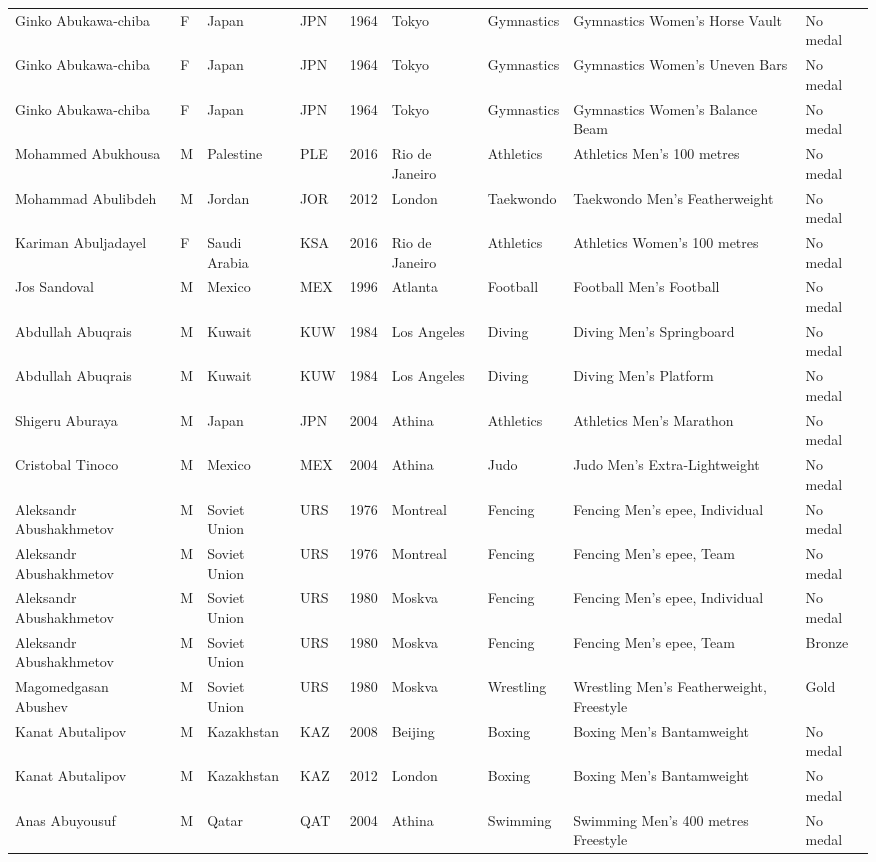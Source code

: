 \documentclass{article}%
\begin{document}
\begin{longtable}{l l l l l l l l l}
Ginko Abukawa{-}chiba&F&Japan&JPN&1964&Tokyo&Gymnastics&Gymnastics Women's Horse Vault&No medal\\%
Ginko Abukawa{-}chiba&F&Japan&JPN&1964&Tokyo&Gymnastics&Gymnastics Women's Uneven Bars&No medal\\%
Ginko Abukawa{-}chiba&F&Japan&JPN&1964&Tokyo&Gymnastics&Gymnastics Women's Balance Beam&No medal\\%
Mohammed Abukhousa&M&Palestine&PLE&2016&Rio de Janeiro&Athletics&Athletics Men's 100 metres&No medal\\%
Mohammad Abulibdeh&M&Jordan&JOR&2012&London&Taekwondo&Taekwondo Men's Featherweight&No medal\\%
Kariman Abuljadayel&F&Saudi Arabia&KSA&2016&Rio de Janeiro&Athletics&Athletics Women's 100 metres&No medal\\%
Jos Sandoval&M&Mexico&MEX&1996&Atlanta&Football&Football Men's Football&No medal\\%
Abdullah Abuqrais&M&Kuwait&KUW&1984&Los Angeles&Diving&Diving Men's Springboard&No medal\\%
Abdullah Abuqrais&M&Kuwait&KUW&1984&Los Angeles&Diving&Diving Men's Platform&No medal\\%
Shigeru Aburaya&M&Japan&JPN&2004&Athina&Athletics&Athletics Men's Marathon&No medal\\%
Cristobal Tinoco&M&Mexico&MEX&2004&Athina&Judo&Judo Men's Extra{-}Lightweight&No medal\\%
Aleksandr Abushakhmetov&M&Soviet Union&URS&1976&Montreal&Fencing&Fencing Men's epee, Individual&No medal\\%
Aleksandr Abushakhmetov&M&Soviet Union&URS&1976&Montreal&Fencing&Fencing Men's epee, Team&No medal\\%
Aleksandr Abushakhmetov&M&Soviet Union&URS&1980&Moskva&Fencing&Fencing Men's epee, Individual&No medal\\%
Aleksandr Abushakhmetov&M&Soviet Union&URS&1980&Moskva&Fencing&Fencing Men's epee, Team&Bronze\\%
Magomedgasan Abushev&M&Soviet Union&URS&1980&Moskva&Wrestling&Wrestling Men's Featherweight, Freestyle&Gold\\%
Kanat Abutalipov&M&Kazakhstan&KAZ&2008&Beijing&Boxing&Boxing Men's Bantamweight&No medal\\%
Kanat Abutalipov&M&Kazakhstan&KAZ&2012&London&Boxing&Boxing Men's Bantamweight&No medal\\%
Anas Abuyousuf&M&Qatar&QAT&2004&Athina&Swimming&Swimming Men's 400 metres Freestyle&No medal\\%

\end{longtable}
\end{document}
